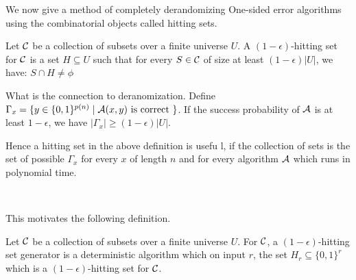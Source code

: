 We now give a method of completely derandomizing One-sided error algorithms using the combinatorial objects called hitting sets.

\begin{definition}
Let ${\cal{C}}$ be a collection of subsets over a finite universe $U$. A $(1-\epsilon)$-hitting set for ${\cal{C}}$ is a set $H \subseteq U$ such that for every $S \in {\cal{C}}$ of size at least $(1-\epsilon)|U|$, we have:
$ S \cap H \ne \phi$
\end{definition}

What is the connection to deranomization. Define $\Gamma_x = \{ y \in \{0,1\}^{p(n)}\mid {\cal{A}}(x,y) \textrm{ is correct }\}$. 
If the success probability of ${\cal{A}}$ is at least $1-\epsilon$, we have $|\Gamma_x| \ge (1-\epsilon)|U|$.

\begin{minipage}{0.6\linewidth}

\noindent Hence a hitting set in the above definition is usefu
l, if the collection of sets is the set of possible $\Gamma_x$ for every $x$ of length $n$ and for every algorithm ${\cal{A}}$ which runs in polynomial time.
\end{minipage}
\begin{minipage}{0.05\linewidth}
~
\end{minipage}
\begin{minipage}{0.25\linewidth}
\end{minipage}

\noindent This motivates the following definition.
\begin{definition}
Let ${\cal{C}}$ be a collection of subsets over a finite universe $U$. For ${\cal{C}}$, a $(1-\epsilon)$-hitting set generator is a deterministic algorithm which on input $r$, the set $H_r \subseteq \{0,1\}^r$ which is a $(1-\epsilon)$-hitting set for ${\cal{C}}$.
\end{definition}

